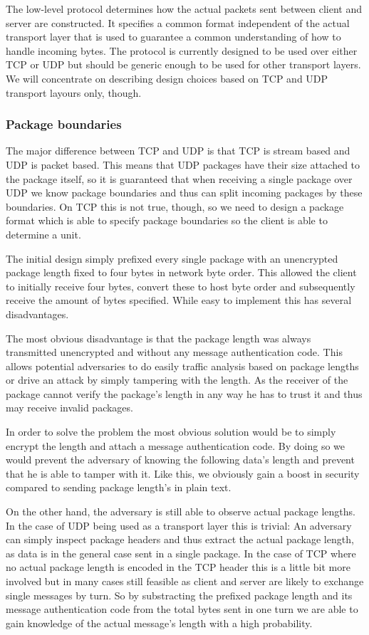The low-level protocol determines how the actual packets sent between client and server are constructed.
It specifies a common format independent of the actual transport layer that is used to guarantee a common understanding of how to handle incoming bytes.
The protocol is currently designed to be used over either TCP or UDP but should be generic enough to be used for other transport layers.
We will concentrate on describing design choices based on TCP and UDP transport layours only, though.

\subsubsection{Package boundaries}

The major difference between TCP and UDP is that TCP is stream based and UDP is packet based.
This means that UDP packages have their size attached to the package itself, so it is guaranteed that when receiving a single package over UDP we know package boundaries and thus can split incoming packages by these boundaries.
On TCP this is not true, though, so we need to design a package format which is able to specify package boundaries so the client is able to determine a unit.

The initial design simply prefixed every single package with an unencrypted package length fixed to four bytes in network byte order.
This allowed the client to initially receive four bytes, convert these to host byte order and subsequently receive the amount of bytes specified.
While easy to implement this has several disadvantages.

The most obvious disadvantage is that the package length was always transmitted unencrypted and without any message authentication code.
This allows potential adversaries to do easily traffic analysis based on package lengths or drive an attack by simply tampering with the length.
As the receiver of the package cannot verify the package's length in any way he has to trust it and thus may receive invalid packages.

In order to solve the problem the most obvious solution would be to simply encrypt the length and attach a message authentication code.
By doing so we would prevent the adversary of knowing the following data's length and prevent that he is able to tamper with it.
Like this, we obviously gain a boost in security compared to sending package length's in plain text.

On the other hand, the adversary is still able to observe actual package lengths.
In the case of UDP being used as a transport layer this is trivial:
An adversary can simply inspect package headers and thus extract the actual package length, as data is in the general case sent in a single package.
In the case of TCP where no actual package length is encoded in the TCP header this is a little bit more involved but in many cases still feasible as client and server are likely to exchange single messages by turn.
So by substracting the prefixed package length and its message authentication code from the total bytes sent in one turn we are able to gain knowledge of the actual message's length with a high probability.

